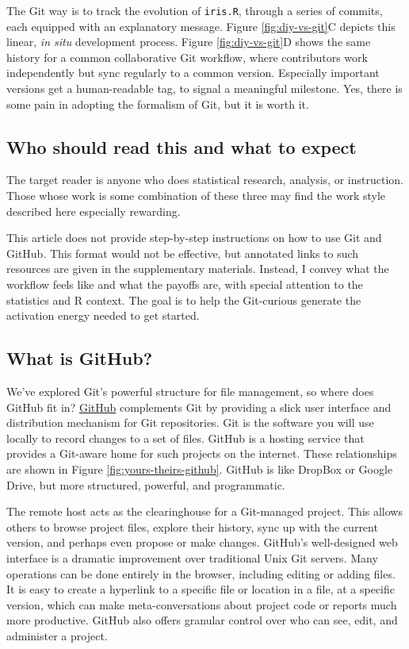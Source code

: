 \documentclass[12pt]{article}
\begin{document}
The Git way is to track the evolution of \texttt{iris.R}, through a
series of commits, each equipped with an explanatory message. Figure
\ref{fig:diy-vs-git}C depicts this linear, \emph{in situ} development
process. Figure \ref{fig:diy-vs-git}D shows the same history for a
common collaborative Git workflow, where contributors work independently
but sync regularly to a common version. Especially important versions
get a human-readable tag, to signal a meaningful milestone. Yes, there
is some pain in adopting the formalism of Git, but it is worth it.

\subsection{Who should read this and what to
expect}\label{who-should-read-this-and-what-to-expect}

The target reader is anyone who does statistical research, analysis, or
instruction. Those whose work is some combination of these three may
find the work style described here especially rewarding.

This article does not provide step-by-step instructions on how to use
Git and GitHub. This format would not be effective, but annotated links
to such resources are given in the supplementary materials. Instead, I
convey what the workflow feels like and what the payoffs are, with
special attention to the statistics and R context. The goal is to help
the Git-curious generate the activation energy needed to get started.

\subsection{What is GitHub?}\label{what-is-github}

We've explored Git's powerful structure for file management, so where
does GitHub fit in? \href{https://github.com}{GitHub} complements Git by
providing a slick user interface and distribution mechanism for Git
repositories. Git is the software you will use locally to record changes
to a set of files. GitHub is a hosting service that provides a Git-aware
home for such projects on the internet. These relationships are shown in
Figure \ref{fig:yours-theirs-github}. GitHub is like DropBox or Google
Drive, but more structured, powerful, and programmatic.

The remote host acts as the clearinghouse for a Git-managed project.
This allows others to browse project files, explore their history, sync
up with the current version, and perhaps even propose or make changes.
GitHub's well-designed web interface is a dramatic improvement over
traditional Unix Git servers. Many operations can be done entirely in
the browser, including editing or adding files. It is easy to create a
hyperlink to a specific file or location in a file, at a specific
version, which can make meta-conversations about project code or reports
much more productive. GitHub also offers granular control over who can
see, edit, and administer a project.
\end{document}
